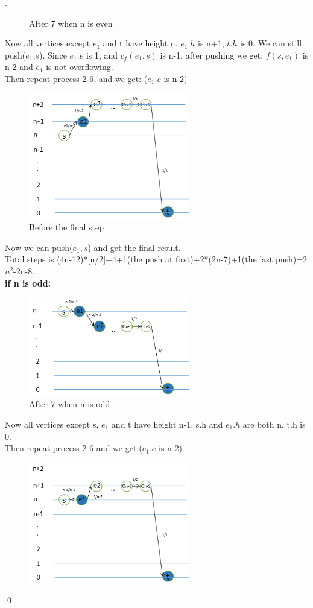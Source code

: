\documentclass[12pt, notitlepage]{article}
\newenvironment{sol}
  {\par\vspace{3mm}\noindent{\it Solution}.}{\qed}
\begin{document}
\begin{sol}
\begin{enumerate}
\begin{figure}[H]
	\caption{After 7 when n is even}
	\end{figure}
Now all vertices except $e_1$ and t have height n. $e_1.h$ is n+1, $t.h$ is 0. We can still push($e_1$,$s$). Since $e_1.e$ is 1, and $c_f(e_1,s)$ is n-1, after pushing we get: $f(s,e_1)$ is n-2 and $e_1$ is not overflowing.\\
Then repeat process 2-6, and we get: ($e_1.e$ is n-2)\\
	\begin{figure}[H]\centering
	\includegraphics[width=7cm]{5.png}
	\caption{Before the final step}
	\end{figure}
Now we can push($e_1,s$) and get the final result.\\
Total steps is (4n-12)*[n/2]+4+1(the push at first)+2*(2n-7)+1(the last push)=2$n^2$-2n-8.\\
\textbf{if n is odd:}\\
	\begin{figure}[H]\centering
	\includegraphics[width=7cm]{6.png}
	\caption{After 7 when n is odd}
	\end{figure}
Now all vertices except s, $e_1$ and t have height n-1. s.h and $e_1.h$ are both n, t.h is 0.\\
Then repeat process 2-6 and we get:($e_1.e$ is n-2)\\
	\begin{figure}[H]\centering
	\includegraphics[width=7cm]{7.png}

\end{figure}
\end{enumerate}
\end{sol}
\end{document}
